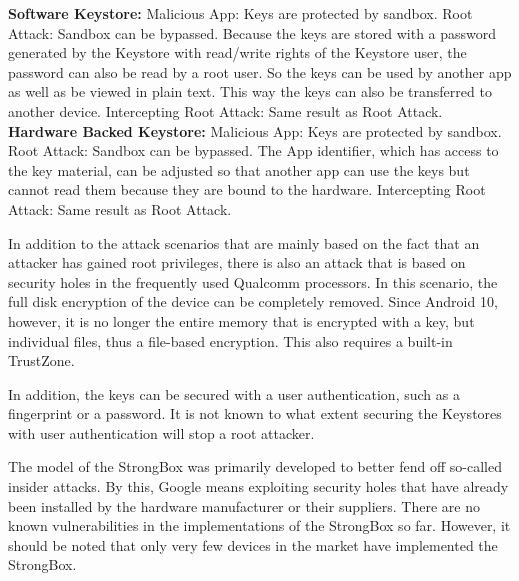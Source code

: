\documentclass[12pt,oneside,a4paper,parskip]{scrbook}
\begin{document}
\textbf{Software Keystore:} \newline
Malicious App: Keys are protected by sandbox.
Root Attack: Sandbox can be bypassed. Because the keys are stored with a password generated by the Keystore with read/write rights of the Keystore user, the password can also be read by a root user. So the keys can be used by another app as well as be viewed in plain text. This way the keys can also be transferred to another device.\newline
Intercepting Root Attack: Same result as Root Attack.\newline
\textbf{Hardware Backed Keystore:} \newline
Malicious App: Keys are protected by sandbox. \newline
Root Attack: Sandbox can be bypassed. The App identifier, which has access to the key material, can be adjusted so that another app can use the keys but cannot read them because they are bound to the hardware.\newline
Intercepting Root Attack: Same result as Root Attack. \newline
\parencite{cooijmans_analysis_2014}

In addition to the attack scenarios that are mainly based on the fact that an attacker has gained root privileges, there is also an attack that is based on security holes in the frequently used Qualcomm processors. In this scenario, the full disk encryption of the device can be completely removed. \parencite{laginimaineb_bits_2016} \newline
Since Android 10, however, it is no longer the entire memory that is encrypted with a key, but individual files, thus a file-based encryption. This also requires a built-in TrustZone. \parencite{noauthor_filebased_nodate}

In addition, the keys can be secured with a user authentication, such as a fingerprint or a password. It is not known to what extent securing the Keystores with user authentication will stop a root attacker.

The model of the StrongBox was primarily developed to better fend off so-called insider attacks. By this, Google means exploiting security holes that have already been installed by the hardware manufacturer or their suppliers. \parencite{mayrhofer_insider_2019}\newline
There are no known vulnerabilities in the implementations of the StrongBox so far. However, it should be noted that only very few devices in the market have implemented the StrongBox. 
\end{document}
